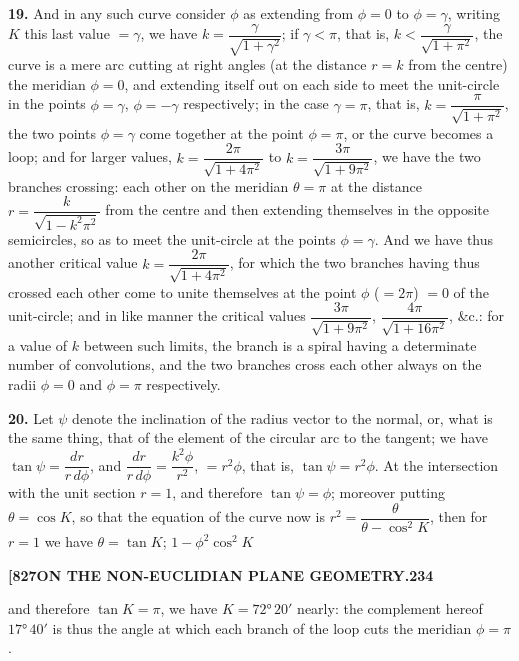 \documentclass[12pt,a4paper]{article}
\theoremstyle{definition}
\begin{document}
\noindent\textbf{19.} And in any such curve consider $\phi$ as extending from $\phi = 0$ to $\phi = \gamma$, writing $K$ this last value $= \gamma$, we have $k = \dfrac{\gamma}{\sqrt{1 + \gamma^2}}$; if $\gamma < \pi$, that is, $k < \dfrac{\gamma}{\sqrt{1 + \pi^2}}$, the curve is a mere arc cutting at right angles (at the distance $r = k$ from the centre) the meridian $\phi = 0$, and extending itself out on each side to meet the unit-circle in the points $\phi = \gamma$, $\phi = -\gamma$ respectively; in the case $\gamma = \pi$, that is, $k = \dfrac{\pi}{\sqrt{1 + \pi^2}}$, the two points $\phi = \gamma$ come together at the point $\phi = \pi$, or the curve becomes a loop; and for larger values, $k = \dfrac{2\pi}{\sqrt{1 + 4\pi^2}}$ to $k = \dfrac{3\pi}{\sqrt{1 + 9\pi^2}}$, we have the two branches crossing: each other on the meridian $\theta = \pi$ at the distance $r = \dfrac{k}{\sqrt{1 - k^2\pi^2}}$ from the centre and then extending themselves in the opposite semicircles, so as to meet the unit-circle at the points $\phi = \gamma$. And we have thus another critical value $k = \dfrac{2\pi}{\sqrt{1 + 4\pi^2}}$, for which the two branches having thus crossed each other come to unite themselves at the point $\phi$ ($= 2\pi$) $= 0$ of the unit-circle; and in like manner the critical values $\dfrac{3\pi}{\sqrt{1 + 9\pi^2}}$, $\dfrac{4\pi}{\sqrt{1 + 16\pi^2}}$, \&c.: for a value of $k$ between such limits, the branch is a spiral having a determinate number of convolutions, and the two branches cross each other always on the radii $\phi = 0$ and $\phi = \pi$ respectively.

\noindent\textbf{20.} Let $\psi$ denote the inclination of the radius vector to the normal, or, what is the same thing, that of the element of the circular arc to the tangent; we have $\tan\psi = \dfrac{dr}{r\,d\phi}$, and $\dfrac{dr}{r\,d\phi} = \dfrac{k^2\phi}{r^2}$, $= r^2\phi$, that is, $\tan\psi = r^2\phi$. At the intersection with the unit section $r = 1$, and therefore $\tan\psi = \phi$; moreover putting $\theta = \cos K$, so that the equation of the curve now is $r^2 = \dfrac{\theta}{\theta - \cos^2 K}$, then for $r = 1$ we have $\theta = \tan K$; $1 - \phi^2\cos^2 K$

\newpage
\setcounter{page}{234}

\noindent\textbf{[827}\hfill\textbf{ON THE NON-EUCLIDIAN PLANE GEOMETRY.}\hfill\textbf{234}

\bigskip

\noindent and therefore $\tan K = \pi$, we have $K = 72°\,20'$ nearly: the complement hereof $17°\,40'$ is thus the angle at which each branch of the loop cuts the meridian $\phi = \pi$.
\end{document}
